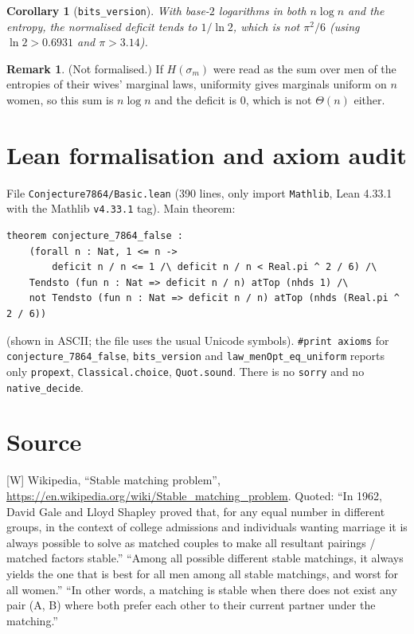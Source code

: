 \documentclass[11pt]{article}
\newtheorem{corollary}[theorem]{Corollary}
\theoremstyle{definition}
\newtheorem{remark}[theorem]{Remark}
\begin{document}
\begin{corollary}[\texttt{bits\_version}]
With base-$2$ logarithms in both $n\log n$ and the entropy, the normalised deficit tends to $1/\ln 2$, which is not
$\pi^2/6$ (using $\ln 2>0.6931$ and $\pi>3.14$).
\end{corollary}

\begin{remark}
(Not formalised.) If $H(\sigma_m)$ were read as the sum over men of the entropies of their wives' marginal laws,
uniformity gives marginals uniform on $n$ women, so this sum is $n\log n$ and the deficit is $0$, which is not
$\Theta(n)$ either.
\end{remark}

\section{Lean formalisation and axiom audit}

File \texttt{Conjecture7864/Basic.lean} (390 lines, only import \texttt{Mathlib}, Lean 4.33.1 with the Mathlib
\texttt{v4.33.1} tag). Main theorem:
\begin{verbatim}
theorem conjecture_7864_false :
    (forall n : Nat, 1 <= n ->
        deficit n / n <= 1 /\ deficit n / n < Real.pi ^ 2 / 6) /\
    Tendsto (fun n : Nat => deficit n / n) atTop (nhds 1) /\
    not Tendsto (fun n : Nat => deficit n / n) atTop (nhds (Real.pi ^ 2 / 6))
\end{verbatim}
(shown in ASCII; the file uses the usual Unicode symbols). \texttt{\#print axioms} for
\texttt{conjecture\_7864\_false}, \texttt{bits\_version} and \texttt{law\_menOpt\_eq\_uniform} reports only
\texttt{propext}, \texttt{Classical.choice}, \texttt{Quot.sound}. There is no \texttt{sorry} and no
\texttt{native\_decide}.

\section*{Source}
[W] Wikipedia, ``Stable matching problem'', \url{https://en.wikipedia.org/wiki/Stable_matching_problem}. Quoted:
``In 1962, David Gale and Lloyd Shapley proved that, for any equal number in different groups, in the context of
college admissions and individuals wanting marriage it is always possible to solve as matched couples to make all
resultant pairings / matched factors stable.'' ``Among all possible different stable matchings, it always yields
the one that is best for all men among all stable matchings, and worst for all women.'' ``In other words, a
matching is stable when there does not exist any pair (A, B) where both prefer each other to their current partner
under the matching.''
\end{document}

